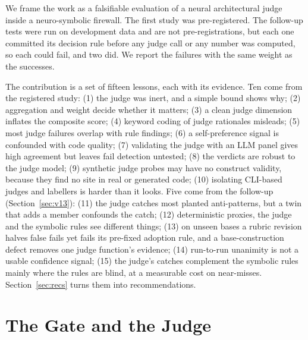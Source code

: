 \documentclass[10pt,a4paper]{article}
\begin{document}
We frame the work as a falsifiable evaluation of a neural architectural judge inside a neuro-symbolic firewall. The
first study was pre-registered. The follow-up tests were run on development data and are not pre-registrations, but
each one committed its decision rule before any judge call or any number was computed, so each could fail, and two
did. We report the failures with the same weight as the successes.

The contribution is a set of fifteen lessons, each with its evidence. Ten come from the registered study: (1) the
judge was inert, and a simple bound shows why; (2) aggregation and weight decide whether it matters; (3) a clean judge
dimension inflates the composite score; (4) keyword coding of judge rationales misleads; (5) most judge failures
overlap with rule findings; (6) a self-preference signal is confounded with code quality; (7) validating the judge with
an LLM panel gives high agreement but leaves fail detection untested; (8) the verdicts are robust to the judge model;
(9) synthetic judge probes may have no construct validity, because they find no site in real or generated code;
(10) isolating CLI-based judges and labellers is harder than it looks. Five come from the follow-up
(Section~\ref{sec:v13}): (11) the judge catches most planted anti-patterns, but a twin that adds a member confounds
the catch; (12) deterministic proxies, the judge and the symbolic rules see different things; (13) on unseen bases a
rubric revision halves false fails yet fails its pre-fixed adoption rule, and a base-construction defect removes one
judge function's evidence; (14) run-to-run unanimity is not a usable confidence signal; (15) the judge's catches
complement the symbolic rules mainly where the rules are blind, at a measurable cost on near-misses.
Section~\ref{sec:recs} turns them into recommendations.

\section{The Gate and the Judge}\label{sec:gate}
\end{document}

